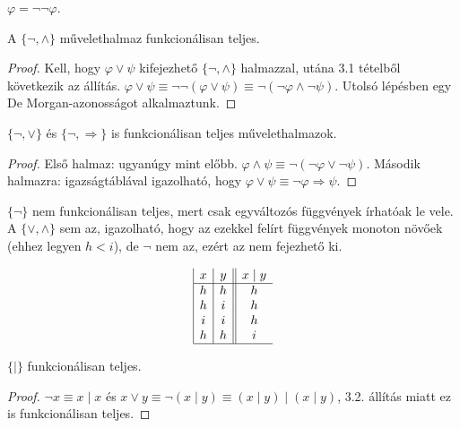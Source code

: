 \begin{exmpl} $\varphi = \lnot \lnot \varphi$.
\end{exmpl}
\begin{state} A $\lbrace \lnot, \land \rbrace$ művelethalmaz funkcionálisan teljes.
\end{state}
\begin{proof} Kell, hogy $\varphi \lor \psi$ kifejezhető $\lbrace \lnot, \land \rbrace$ halmazzal, utána 3.1 tételből következik az állítás.
$\varphi \lor \psi \equiv \lnot \lnot (\varphi \lor \psi) \equiv \lnot (\lnot \varphi \land \lnot \psi)$. Utolsó lépésben egy De Morgan-azonosságot alkalmaztunk.
\end{proof}
\begin{state} $\lbrace \lnot, \lor \rbrace$ és $\lbrace \lnot, \Rightarrow \rbrace$ is funkcionálisan teljes művelethalmazok.
\end{state}
\begin{proof} Első halmaz: ugyanúgy mint előbb. $\varphi \land \psi \equiv \lnot(\lnot \varphi \lor \lnot \psi)$. Második halmazra: igazságtáblával igazolható, hogy $\varphi \lor \psi \equiv \lnot \varphi \Rightarrow \psi$.
\end{proof}
\begin{fairytale} $\lbrace \lnot \rbrace$ nem funkcionálisan teljes, mert csak egyváltozós függvények írhatóak le vele. A $\lbrace \lor, \land \rbrace$ sem az, igazolható, hogy az ezekkel felírt függvények monoton növőek (ehhez legyen $h < i$), de $\lnot$ nem az, ezért az nem fejezhető ki.
\end{fairytale}
\begin{defi}
\begin{displaymath}
\begin{array}{|c|c||c}
   x
 & y
 & x \mid y  \\
\hline
h & h & h \\
h & i & h \\
i & i & h \\
h & h & i \\
\hline
\end{array}
\end{displaymath}
\end{defi}
\begin{state}
$\lbrace \mid \rbrace$ funkcionálisan teljes.
\end{state}
\begin{proof}
$\lnot x \equiv x \mid x$ és $x \lor y \equiv \lnot (x \mid y) \equiv (x \mid y) \mid (x \mid y)$, 3.2. állítás miatt ez is funkcionálisan teljes.
\end{proof}
